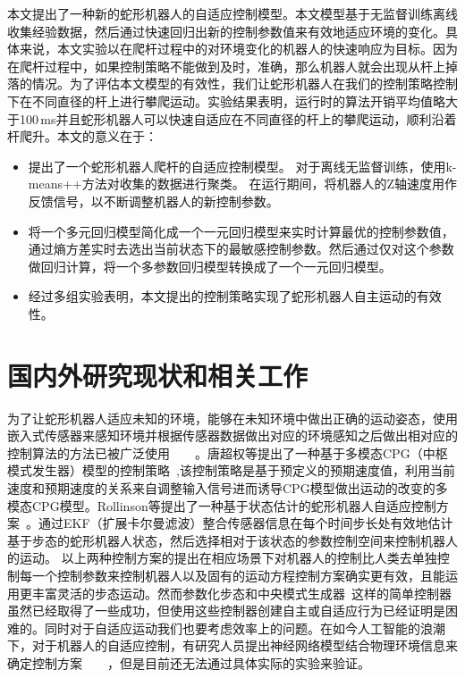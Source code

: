 本文提出了一种新的蛇形机器人的自适应控制模型。本文模型基于无监督训练离线收集经验数据，然后通过快速回归出新的控制参数值来有效地适应环境的变化。具体来说，本文实验以在爬杆过程中的对环境变化的机器人的快速响应为目标。因为在爬杆过程中，如果控制策略不能做到及时，准确，那么机器人就会出现从杆上掉落的情况。为了评估本文模型的有效性，我们让蛇形机器人在我们的控制策略控制下在不同直径的杆上进行攀爬运动。实验结果表明，运行时的算法开销平均值略大于100\,ms并且蛇形机器人可以快速自适应在不同直径的杆上的攀爬运动，顺利沿着杆爬升。本文的意义在于：
\begin{itemize}
	\item 提出了一个蛇形机器人爬杆的自适应控制模型。 对于离线无监督训练，使用k-means++方法对收集的数据进行聚类。 在运行期间，将机器人的Z轴速度用作反馈信号，以不断调整机器人的新控制参数。
	\item 将一个多元回归模型简化成一个一元回归模型来实时计算最优的控制参数值，通过熵方差实时去选出当前状态下的最敏感控制参数。然后通过仅对这个参数做回归计算，将一个多参数回归模型转换成了一个一元回归模型。
	\item 经过多组实验表明，本文提出的控制策略实现了蛇形机器人自主运动的有效性。
\end{itemize}

\section{国内外研究现状和相关工作}
\label{sec:related_work}

为了让蛇形机器人适应未知的环境，能够在未知环境中做出正确的运动姿态，使用嵌入式传感器来感知环境并根据传感器数据做出对应的环境感知之后做出相对应的控制算法的方法已被广泛使用~\cite{BalancingAndControl}~\cite{FeedbackControlOfSoft}~\cite{CPGenabling}~\cite{GaitBasedCompliant}。唐超权等提出了一种基于多模态CPG（中枢模式发生器）模型的控制策略~\cite{CPGenabling},该控制策略是基于预定义的预期速度值，利用当前速度和预期速度的关系来自调整输入信号进而诱导CPG模型做出运动的改变的多模态CPG模型。Rollinson等提出了一种基于状态估计的蛇形机器人自适应控制方案~\cite{GaitBasedCompliant}。通过EKF（扩展卡尔曼滤波）整合传感器信息在每个时间步长处有效地估计基于步态的蛇形机器人状态，然后选择相对于该状态的参数控制空间来控制机器人的运动。 以上两种控制方案的提出在相应场景下对机器人的控制比人类去单独控制每一个控制参数来控制机器人以及固有的运动方程控制方案确实更有效，且能运用更丰富灵活的步态运动。然而参数化步态和中央模式生成器~\cite{ijspeert2008central}这样的简单控制器虽然已经取得了一些成功，但使用这些控制器创建自主或自适应行为已经证明是困难的。同时对于自适应运动我们也要考虑效率上的问题。在如今人工智能的浪潮下，对于机器人的自适应控制，有研究人员提出神经网络模型结合物理环境信息来确定控制方案~\cite{InformationDriven}~\cite{NovelPlasticityRule}~\cite{MissileSystems}~\cite{NeuroFuzzyBayesian}，但是目前还无法通过具体实际的实验来验证。


